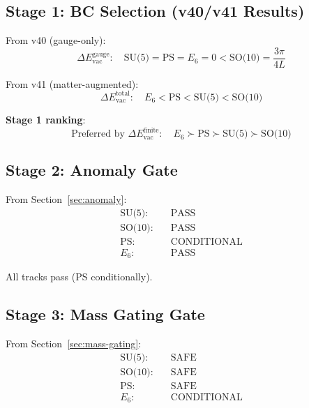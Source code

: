 \documentclass[11pt,a4paper]{article}
\begin{document}
\subsection{Stage 1: BC Selection (v40/v41 Results)}

From v40 (gauge-only):
\begin{equation}
\label{eq:v40-result}
\Delta E_{\text{vac}}^{\text{gauge}}: \quad \text{SU(5)} = \text{PS} = E_6 = 0 < \text{SO(10)} = \frac{3\pi}{4L}
\end{equation}

From v41 (matter-augmented):
\begin{equation}
\label{eq:v41-result}
\Delta E_{\text{vac}}^{\text{total}}: \quad E_6 < \text{PS} < \text{SU(5)} < \text{SO(10)}
\end{equation}

\textbf{Stage 1 ranking}:
\begin{equation}
\label{eq:stage1-rank}
\text{Preferred by } \Delta E_{\text{vac}}^{\text{finite}}: \quad E_6 \succ \text{PS} \succ \text{SU(5)} \succ \text{SO(10)}
\end{equation}

\subsection{Stage 2: Anomaly Gate}

From Section~\ref{sec:anomaly}:
\begin{align}
\label{eq:anomaly-su5}
\text{SU(5):} \quad & \text{PASS} \\
\label{eq:anomaly-so10}
\text{SO(10):} \quad & \text{PASS} \\
\label{eq:anomaly-ps}
\text{PS:} \quad & \text{CONDITIONAL} \\
\label{eq:anomaly-e6}
E_6: \quad & \text{PASS}
\end{align}

All tracks pass (PS conditionally).

\subsection{Stage 3: Mass Gating Gate}

From Section~\ref{sec:mass-gating}:
\begin{align}
\label{eq:gating-result-su5}
\text{SU(5):} \quad & \text{SAFE} \\
\label{eq:gating-result-so10}
\text{SO(10):} \quad & \text{SAFE} \\
\label{eq:gating-result-ps}
\text{PS:} \quad & \text{SAFE} \\
\label{eq:gating-result-e6}
E_6: \quad & \text{CONDITIONAL}
\end{align}
\end{document}
